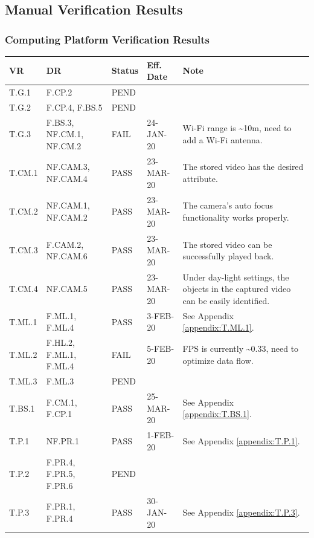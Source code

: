 \documentclass[10pt,letterpaper]{article}
\begin{document}
\subsection{Manual Verification Results}
\subsubsection{Computing Platform Verification Results}
\begin{table}[H]
	\centering
	\begin{tabular}{lllll}
	\hline
	\textbf{VR} & \textbf{DR} & \textbf{Status} & \textbf{Eff. Date} & \textbf{Note}\\
	\hline
	T.G.1 & F.CP.2 & PEND   & \\
	T.G.2 & F.CP.4, F.BS.5 & PEND   & \\
	T.G.3 & F.BS.3, NF.CM.1, NF.CM.2 & FAIL   & 24-JAN-20 & Wi-Fi range is \textasciitilde 10m, need to add a Wi-Fi antenna. \\
	\hline
	T.CM.1 & NF.CAM.3, NF.CAM.4   & PASS   & 23-MAR-20 & The stored video has the desired attribute.\\
	T.CM.2 & NF.CAM.1, NF.CAM.2   & PASS   & 23-MAR-20 & The camera's auto focus functionality works properly. \\
	T.CM.3 & F.CAM.2, NF.CAM.6   & PASS   & 23-MAR-20 & The stored video can be successfully played back. \\
	T.CM.4 & NF.CAM.5   & PASS   & 23-MAR-20 & Under day-light settings, the objects in the captured video can be easily identified. \\
	\hline
	T.ML.1 & F.ML.1, F.ML.4 & PASS & 3-FEB-20 & See Appendix \ref{appendix:T.ML.1}.\\
	T.ML.2 & F.HL.2, F.ML.1, F.ML.4 & FAIL  & 5-FEB-20 & FPS is currently \textasciitilde 0.33, need to optimize data flow. \\
    T.ML.3 & F.ML.3 & PEND   & \\
    \hline
    T.BS.1 & F.CM.1, F.CP.1 & PASS & 25-MAR-20 & See Appendix \ref{appendix:T.BS.1}. \\
    \hline
    T.P.1 & NF.PR.1 & PASS   & 1-FEB-20 & See Appendix \ref{appendix:T.P.1}.\\
    T.P.2 & F.PR.4, F.PR.5, F.PR.6 & PEND   & \\
    T.P.3 & F.PR.1, F.PR.4 & PASS   & 30-JAN-20 & See Appendix \ref{appendix:T.P.3}. \\
	\hline
	\end{tabular}
\end{table}
\end{document}

